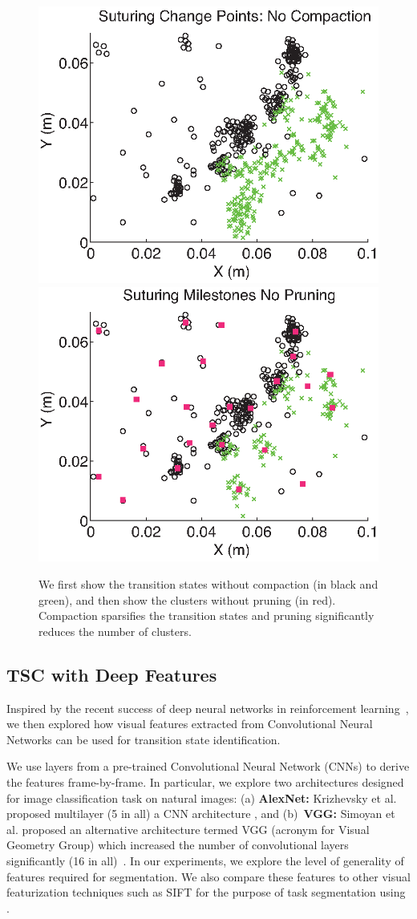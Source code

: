 
\begin{figure}[ht!]
    \centering
    \includegraphics[width=0.35\columnwidth]{tsc-experiments/suturing_milestones_no_compaction}
    \includegraphics[width=0.35\columnwidth]{tsc-experiments/suturing_milestones_no_pruning}
    \caption{We first show the transition states without compaction (in black and green), and then show the clusters without pruning (in red). Compaction sparsifies the transition states and pruning significantly reduces the number of clusters.}
    \label{exp:removal}
\end{figure}
 
\subsection*{TSC with Deep Features}
Inspired by the recent success of deep neural networks in reinforcement learning~\cite{levine2015end, lenz2015deep}, we then explored how visual features extracted from Convolutional Neural Networks can be used for transition state identification.

We use layers from a pre-trained Convolutional Neural Network (CNNs) to derive the features frame-by-frame. In particular, we explore two architectures designed for image classification task on natural images: (a) \textbf{AlexNet: } Krizhevsky et al. proposed multilayer (5 in all) a CNN architecture \cite{krizhevsky2012imagenet}, and (b)~\textbf{VGG: } Simoyan et al. proposed an alternative architecture termed VGG (acronym for Visual Geometry Group) which increased the number of convolutional layers significantly (16 in all)~\cite{simonyan2014very}. In our experiments, we explore the level of generality of features required for segmentation. We also compare these features to other visual featurization techniques such as SIFT for the purpose of task segmentation using \tsc. 


